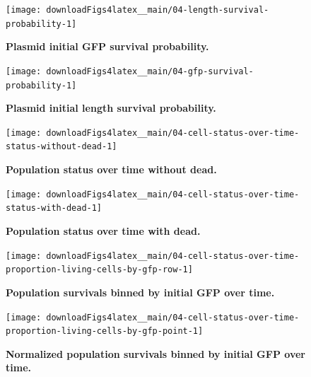 \documentclass[a4paper, nobind]{templates/ociamthesis}
\begin{document}
\begin{figure}[H]
\texttt{[image: downloadFigs4latex\_\_main/04-length-survival-probability-1]} \caption[Plasmid initial GFP survival probability.]{\textbf{Plasmid initial GFP survival probability.}}\label{fig:04-length-survival-probability-1}
\end{figure}





\begin{figure}[H]
\texttt{[image: downloadFigs4latex\_\_main/04-gfp-survival-probability-1]} \caption[Plasmid initial length survival probability.]{\textbf{Plasmid initial length survival probability.}}\label{fig:04-gfp-survival-probability-1}
\end{figure}





\begin{figure}[H]
\texttt{[image: downloadFigs4latex\_\_main/04-cell-status-over-time-status-without-dead-1]} \caption[Population status over time without dead.]{\textbf{Population status over time without dead.}}\label{fig:04-cell-status-over-time-status-without-dead-1}
\end{figure}





\begin{figure}[H]
\texttt{[image: downloadFigs4latex\_\_main/04-cell-status-over-time-status-with-dead-1]} \caption[Population status over time with dead.]{\textbf{Population status over time with dead.}}\label{fig:04-cell-status-over-time-status-with-dead-1}
\end{figure}





\begin{figure}[H]
\texttt{[image: downloadFigs4latex\_\_main/04-cell-status-over-time-proportion-living-cells-by-gfp-row-1]} \caption[Population survivals binned by initial GFP over time.]{\textbf{Population survivals binned by initial GFP over time.}}\label{fig:04-cell-status-over-time-proportion-living-cells-by-gfp-row-1}
\end{figure}





\begin{figure}[H]
\texttt{[image: downloadFigs4latex\_\_main/04-cell-status-over-time-proportion-living-cells-by-gfp-point-1]} \caption[Normalized population survivals binned by initial GFP over time.]{\textbf{Normalized population survivals binned by initial GFP over time.}}\label{fig:04-cell-status-over-time-proportion-living-cells-by-gfp-point-1}
\end{figure}
\end{document}
